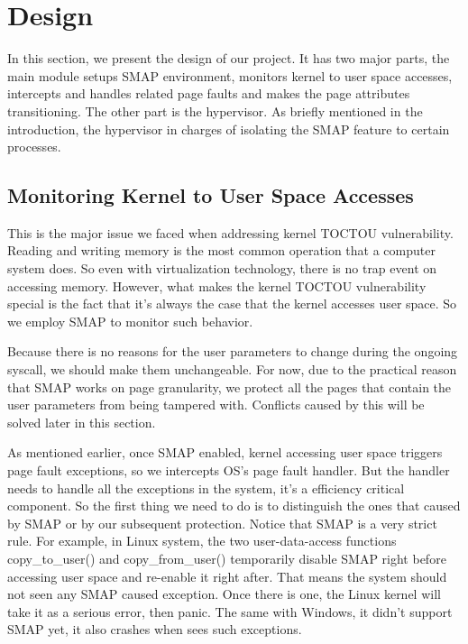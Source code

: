 
\section{Design}
\label{sec:design}

In this section, we present the design of our project. It has two major parts, the main module setups SMAP environment, monitors kernel to user space accesses, intercepts and handles related page faults and makes the page attributes transitioning. The other part is the hypervisor. As briefly mentioned in the introduction, the hypervisor in charges of isolating the SMAP feature to certain processes.

\subsection{Monitoring Kernel to User Space Accesses}

This is the major issue we faced when addressing kernel TOCTOU vulnerability. Reading and writing memory is the most common operation that a computer system does. So even with virtualization technology, there is no trap event on accessing memory. However, what makes the kernel TOCTOU vulnerability special is the fact that it's always the case that the kernel accesses user space. So we employ SMAP to monitor such behavior. 

Because there is no reasons for the user parameters to change during the ongoing syscall, we should make them unchangeable. For now, due to the practical reason that SMAP works on page granularity, we protect all the pages that contain the user parameters from being tampered with. Conflicts caused by this will be solved later in this section.

As mentioned earlier, once SMAP enabled, kernel accessing user space triggers page fault exceptions, so we intercepts OS's page fault handler. But the handler needs to handle all the exceptions in the system, it's a efficiency critical component. So the first thing we need to do is to distinguish the ones that caused by SMAP or by our subsequent protection. Notice that SMAP is a very strict rule. For example, in Linux system, the two user-data-access functions copy\_to\_user() and copy\_from\_user() temporarily disable SMAP right before accessing user space and re-enable it right after. That means the system should not seen any SMAP caused exception. Once there is one, the Linux kernel will take it as a serious error, then panic. The same with Windows, it didn't support SMAP yet, it also crashes when sees such exceptions.

